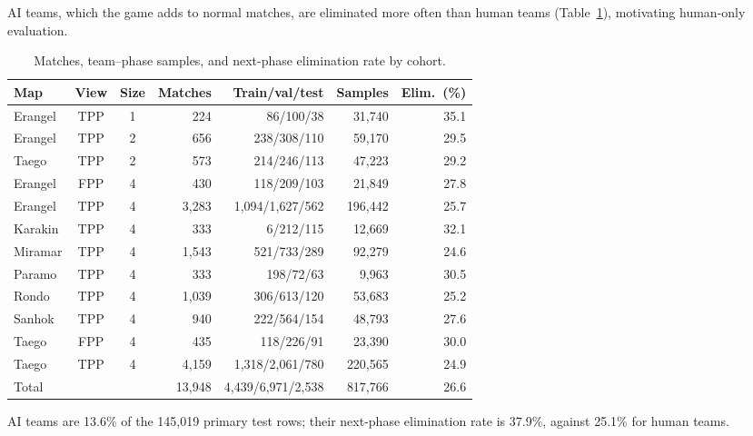\documentclass[sigconf,anonymous]{acmart}
\begin{document}
AI teams, which the game adds to normal matches, are eliminated more often than human teams (Table~\ref{tab:cohorts}), motivating human-only evaluation.

\begin{table}[t]
\centering
\caption{Matches, team--phase samples, and next-phase elimination rate by cohort.}
\label{tab:cohorts}
\footnotesize
\setlength{\tabcolsep}{2.7pt}
\begin{tabular}{lccrrrr}
\hline
Map & View & Size & Matches & Train/val/test & Samples & Elim.\ (\%) \\
\hline
Erangel & TPP & 1 & 224 & 86/100/38 & 31,740 & 35.1 \\
Erangel & TPP & 2 & 656 & 238/308/110 & 59,170 & 29.5 \\
Taego & TPP & 2 & 573 & 214/246/113 & 47,223 & 29.2 \\
Erangel & FPP & 4 & 430 & 118/209/103 & 21,849 & 27.8 \\
Erangel & TPP & 4 & 3,283 & 1,094/1,627/562 & 196,442 & 25.7 \\
Karakin & TPP & 4 & 333 & 6/212/115 & 12,669 & 32.1 \\
Miramar & TPP & 4 & 1,543 & 521/733/289 & 92,279 & 24.6 \\
Paramo & TPP & 4 & 333 & 198/72/63 & 9,963 & 30.5 \\
Rondo & TPP & 4 & 1,039 & 306/613/120 & 53,683 & 25.2 \\
Sanhok & TPP & 4 & 940 & 222/564/154 & 48,793 & 27.6 \\
Taego & FPP & 4 & 435 & 118/226/91 & 23,390 & 30.0 \\
Taego & TPP & 4 & 4,159 & 1,318/2,061/780 & 220,565 & 24.9 \\
\hline
Total & & & 13,948 & 4,439/6,971/2,538 & 817,766 & 26.6 \\
\hline
\end{tabular}
\smallskip
\parbox{\columnwidth}{\scriptsize AI teams are 13.6\% of the 145,019 primary test rows; their next-phase elimination rate is 37.9\%, against 25.1\% for human teams.}
\end{table}
\end{document}
